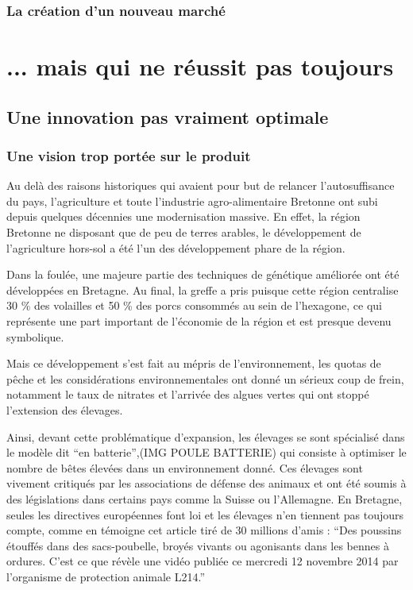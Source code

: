 \documentclass[a4paper,10pt]{report}
\begin{document}
		\subsection{La création d'un nouveau marché}

\chapter{... mais qui ne réussit pas toujours}

	\section{Une innovation pas vraiment optimale}
	
		\subsection{Une vision trop portée sur le produit}
			Au delà des raisons historiques qui avaient pour but de relancer l’autosuffisance du pays, l’agriculture et toute l’industrie agro-alimentaire Bretonne ont subi depuis quelques décennies une modernisation massive. En effet, la région Bretonne ne disposant que de peu de terres arables, le développement de l’agriculture hors-sol a été l’un des développement phare de la région. 
			
			Dans la foulée, une majeure partie des techniques de génétique améliorée ont été développées en Bretagne. Au final, la greffe a pris puisque cette région centralise 30 \% des volailles et 50 \% des porcs consommés au sein de l’hexagone, ce qui représente une part important de l’économie de la région et est presque devenu symbolique.
			
			Mais ce développement s’est fait au mépris de l’environnement, les quotas de pêche et les considérations environnementales ont donné un sérieux coup de frein, notamment le taux de nitrates et l’arrivée des algues vertes qui ont stoppé l’extension des élevages.
			
			Ainsi, devant cette problématique d’expansion, les élevages se sont spécialisé dans le modèle dit “en batterie”,(IMG POULE BATTERIE) qui consiste à optimiser le nombre de bêtes élevées dans un environnement donné. Ces élevages sont vivement critiqués par les associations de défense des animaux  et ont été soumis à des législations dans certains pays comme la Suisse ou l’Allemagne. En Bretagne, seules les directives européennes font loi et les élevages n’en tiennent pas toujours compte, comme en témoigne cet article tiré de 30 millions d’amis\cite{BretagnePoussinsBroyesEtouffesDansCouvoir} : “Des poussins étouffés dans des sacs-poubelle, broyés vivants ou agonisants dans les bennes à ordures. C'est ce que révèle une vidéo publiée ce mercredi 12 novembre 2014 par l’organisme de protection animale L214.”
			
\end{document}
